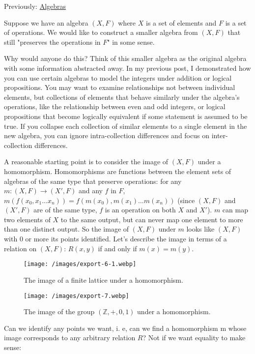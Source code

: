 \documentclass{article}
\begin{document}
Previously: \href{/posts/2021-04-02-algebras.html}{Algebras}

Suppose we have an algebra $(X, F)$ where $X$ is a set of elements and $F$ is a set of operations. We would like to construct a smaller algebra from $(X, F)$ that still "preserves the operations in $F$" in some sense.

Why would anyone do this? Think of this smaller algebra as the original algebra with some information abstracted away. In my previous post, I demonstrated how you can use certain algebras to model the integers under addition or logical propositions. You may want to examine relationships not between individual elements, but collections of elements that behave similarly under the algebra's operations, like the relationship between even and odd integers, or logical propositions that become logically equivalent if some statement is assumed to be true. If you collapse each collection of similar elements to a single element in the new algebra, you can ignore intra-collection differences and focus on inter-collection differences. 

A reasonable starting point is to consider the image of $(X, F)$ under a homomorphism. Homomorphisms are functions between the element sets of algebras of the same type that preserve operations: for any $m: (X, F) \to (X', F)$ and any $f$ in $F$, $m(f(x_0, x_1 \dots x_n)) = f(m(x_0), m(x_1) \dots m(x_n))$ (since $(X, F)$ and $(X', F)$ are of the same type, $f$ is an operation on both $X$ and $X'$). $m$ can map two elements of $X$ to the same output, but can never map one element to more than one distinct output. So the image of $(X, F)$ under $m$ looks like $(X, F)$ with 0 or more its points identified. Let's describe the image in terms of a relation on $(X, F)$: $R(x, y)$ if and only if $m(x) = m(y)$.

\begin{figure}
\texttt{[image: /images/export-6-1.webp]}
\caption{The image of a finite lattice under a homomorphism.}
\end{figure}

\begin{figure}
\texttt{[image: /images/export-7.webp]}
\caption{The image of the group $(\mathbb{Z}, +, 0, 1)$ under a homomorphism.}
\end{figure}

Can we identify any points we want, i. e, can we find a homomorphism m whose image corresponds to any arbitrary relation $R$? Not if we want equality to make sense:
\end{document}

